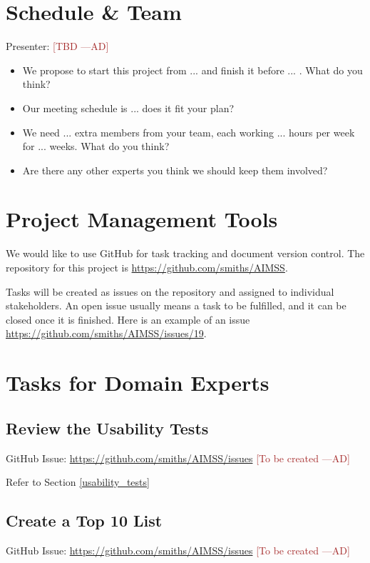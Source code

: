 \documentclass[12pt]{article}
\newcommand{\authornote}[3]{\textcolor{#1}{[#3 ---#2]}}
\newcommand{\authornote}[3]{}
\newcommand{\ad}[1]{\authornote{brown}{AD}{#1}} %
\begin{document}
\section{Schedule \& Team}
Presenter: \ad{TBD}

\begin{itemize}
\item We propose to start this project from ... and finish it before ... . What
do you think?
\item Our meeting schedule is ... does it fit your plan?
\item We need ... extra members from your team, each working ... hours per week
for ... weeks. What do you think?
\item Are there any other experts you think we should keep them involved?
\end{itemize}

\appendix
\section{Project Management Tools}
\label{proj_mgmt_tools}
We would like to use GitHub for task tracking and document version control. The
repository for this project is
\href{https://github.com/smiths/AIMSS}{https://github.com/smiths/AIMSS}.

Tasks will be created as issues on the repository and assigned to individual
stakeholders. An open issue usually means a task to be fulfilled, and it can be
closed once it is finished. Here is an example of an issue
\href{https://github.com/smiths/AIMSS/issues/19}{https://github.com/smiths/AIMSS/issues/19}.

\newpage

\section{Tasks for Domain Experts}
\label{tasks_domain_experts}

\subsection{Review the Usability Tests}
\label{task_usability_tests}
GitHub Issue:
\href{https://github.com/smiths/AIMSS/issues}{https://github.com/smiths/AIMSS/issues}
\ad{To be created}

\noindent Refer to Section \ref{usability_tests}

\subsection{Create a Top 10 List}
\label{task_top_10_list}
GitHub Issue:
\href{https://github.com/smiths/AIMSS/issues}{https://github.com/smiths/AIMSS/issues}
\ad{To be created}
\end{document}
